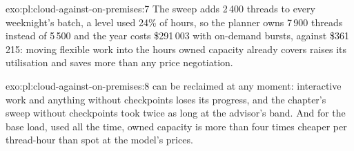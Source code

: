 \begin{solution}{exo:pl:cloud-against-on-premises:7}
The sweep adds 2\,400 threads to every weeknight's batch, a level used 24\% of hours, so the planner owns 7\,900 threads instead of 5\,500 and the
year costs \$291\,003 with on-demand bursts, against \$361\,215: moving flexible work into the hours owned capacity already covers raises its
utilisation and saves more than any price negotiation.
\end{solution}

\begin{solution}{exo:pl:cloud-against-on-premises:8}
 can be reclaimed at any moment: interactive work and anything without checkpoints loses its progress, and the chapter's sweep
without checkpoints took twice as long at the advisor's band. And for the base load, used all the time, owned capacity is more than four times cheaper per
thread-hour than spot at the model's prices.
\end{solution}

